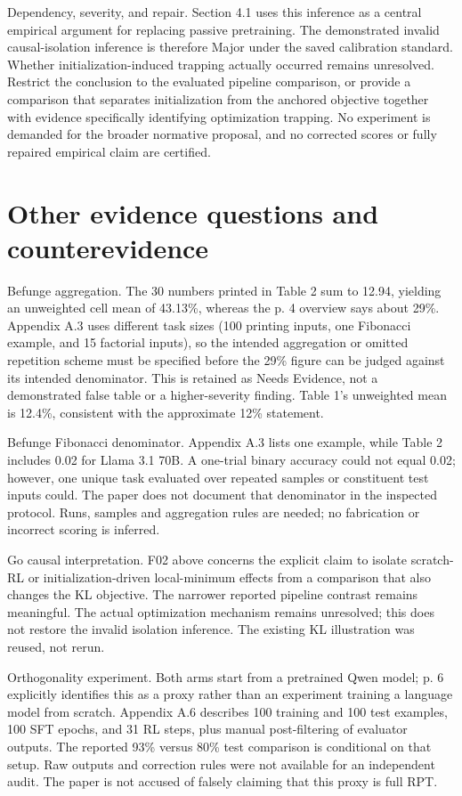 \documentclass[10pt]{article}
\begin{document}
Dependency, severity, and repair. Section 4.1 uses this inference as a central empirical argument for replacing passive pretraining. The demonstrated invalid causal-isolation inference is therefore Major under the saved calibration standard. Whether initialization-induced trapping actually occurred remains unresolved. Restrict the conclusion to the evaluated pipeline comparison, or provide a comparison that separates initialization from the anchored objective together with evidence specifically identifying optimization trapping. No experiment is demanded for the broader normative proposal, and no corrected scores or fully repaired empirical claim are certified.\par
\section*{Other evidence questions and counterevidence}
Befunge aggregation. The 30 numbers printed in Table 2 sum to 12.94, yielding an unweighted cell mean of 43.13\%, whereas the p. 4 overview says about 29\%. Appendix A.3 uses different task sizes (100 printing inputs, one Fibonacci example, and 15 factorial inputs), so the intended aggregation or omitted repetition scheme must be specified before the 29\% figure can be judged against its intended denominator. This is retained as Needs Evidence, not a demonstrated false table or a higher-severity finding. Table 1’s unweighted mean is 12.4\%, consistent with the approximate 12\% statement.\par
Befunge Fibonacci denominator. Appendix A.3 lists one example, while Table 2 includes 0.02 for Llama 3.1 70B. A one-trial binary accuracy could not equal 0.02; however, one unique task evaluated over repeated samples or constituent test inputs could. The paper does not document that denominator in the inspected protocol. Runs, samples and aggregation rules are needed; no fabrication or incorrect scoring is inferred.\par
Go causal interpretation. F02 above concerns the explicit claim to isolate scratch-RL or initialization-driven local-minimum effects from a comparison that also changes the KL objective. The narrower reported pipeline contrast remains meaningful. The actual optimization mechanism remains unresolved; this does not restore the invalid isolation inference. The existing KL illustration was reused, not rerun.\par
Orthogonality experiment. Both arms start from a pretrained Qwen model; p. 6 explicitly identifies this as a proxy rather than an experiment training a language model from scratch. Appendix A.6 describes 100 training and 100 test examples, 100 SFT epochs, and 31 RL steps, plus manual post-filtering of evaluator outputs. The reported 93\% versus 80\% test comparison is conditional on that setup. Raw outputs and correction rules were not available for an independent audit. The paper is not accused of falsely claiming that this proxy is full RPT.\par
\end{document}
